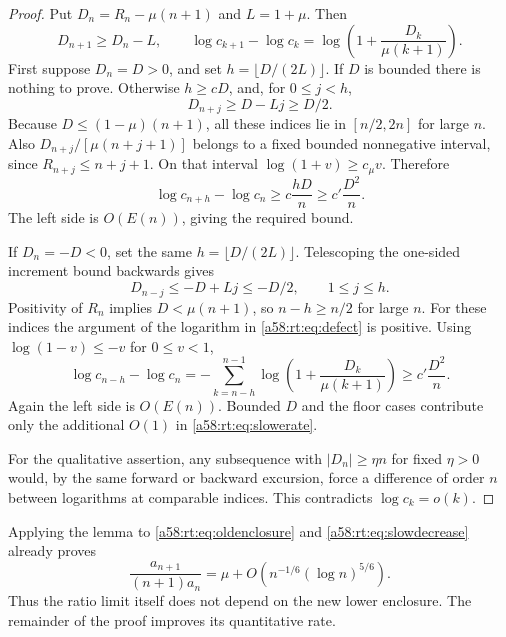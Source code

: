 \documentclass[11pt,letterpaper]{article}
\theoremstyle{remark}
\begin{document}
\begin{proof}
Put $D_n=R_n-\mu(n+1)$ and $L=1+\mu$. Then
\begin{equation}\label{a58:rt:eq:defect}
 D_{n+1}\ge D_n-L,\qquad
 \log c_{k+1}-\log c_k
 =\log\left(1+\frac{D_k}{\mu(k+1)}\right).
\end{equation}
First suppose $D_n=D>0$, and set $h=\lfloor D/(2L)\rfloor$.
If $D$ is bounded there is nothing to prove. Otherwise $h\ge cD$,
and, for $0\le j<h$,
\[
 D_{n+j}\ge D-Lj\ge D/2.
\]
Because $D\le(1-\mu)(n+1)$, all these indices lie in $[n/2,2n]$
for large $n$. Also $D_{n+j}/[\mu(n+j+1)]$ belongs to a fixed bounded
nonnegative interval, since $R_{n+j}\le n+j+1$. On that interval
$\log(1+v)\ge c_\mu v$. Therefore
\begin{equation}\label{a58:rt:eq:posexcursion}
 \log c_{n+h}-\log c_n
 \ge c\frac{hD}{n}\ge c'\frac{D^2}{n}.
\end{equation}
The left side is $O(E(n))$, giving the required bound.

If $D_n=-D<0$, set the same $h=\lfloor D/(2L)\rfloor$.
Telescoping the one-sided increment bound backwards gives
\[
 D_{n-j}\le-D+Lj\le-D/2,\qquad1\le j\le h.
\]
Positivity of $R_n$ implies $D<\mu(n+1)$, so $n-h\ge n/2$ for
large $n$. For these indices the argument of the logarithm in
\eqref{a58:rt:eq:defect} is positive. Using $\log(1-v)\le-v$ for $0\le v<1$,
\begin{equation}\label{a58:rt:eq:negexcursion}
 \log c_{n-h}-\log c_n
 =-\sum_{k=n-h}^{n-1}\log\left(1+\frac{D_k}{\mu(k+1)}\right)
 \ge c'\frac{D^2}{n}.
\end{equation}
Again the left side is $O(E(n))$. Bounded $D$ and the floor cases
contribute only the additional $O(1)$ in \eqref{a58:rt:eq:slowerate}.

For the qualitative assertion, any subsequence with $|D_n|\ge\eta n$
for fixed $\eta>0$ would, by the same forward or backward excursion,
force a difference of order $n$ between logarithms at comparable
indices. This contradicts $\log c_k=o(k)$.
\end{proof}

Applying the lemma to \eqref{a58:rt:eq:oldenclosure} and
\eqref{a58:rt:eq:slowdecrease} already proves
\begin{equation}\label{a58:rt:eq:oldrateratio}
 \frac{a_{n+1}}{(n+1)a_n}
 =\mu+O\!\left(n^{-1/6}(\log n)^{5/6}\right).
\end{equation}
Thus the ratio limit itself does not depend on the new lower enclosure.
The remainder of the proof improves its quantitative rate.
\end{document}
